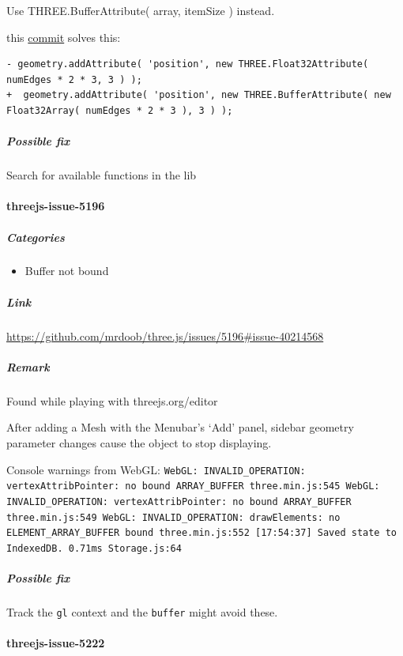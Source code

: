 \documentclass[]{article}
\begin{document}
Use THREE.BufferAttribute( array, itemSize ) instead.

this
\href{https://github.com/mrdoob/three.js/commit/e5b1d38e1e90bc9f7b16da7c1e53e66c5e8c2178}{commit}
solves this:

\begin{verbatim}
- geometry.addAttribute( 'position', new THREE.Float32Attribute( numEdges * 2 * 3, 3 ) );
+  geometry.addAttribute( 'position', new THREE.BufferAttribute( new Float32Array( numEdges * 2 * 3 ), 3 ) );
\end{verbatim}

\subparagraph{Possible fix}\label{possible-fix-2}

Search for available functions in the lib

\paragraph{threejs-issue-5196}\label{threejs-issue-5196}

\subparagraph{Categories}\label{categories-4}

\begin{itemize}
\itemsep1pt\parskip0pt
\item
  Buffer not bound
\end{itemize}

\subparagraph{Link}\label{link-4}

\url{https://github.com/mrdoob/three.js/issues/5196\#issue-40214568}

\subparagraph{Remark}\label{remark-4}

Found while playing with threejs.org/editor

After adding a Mesh with the Menubar's `Add' panel, sidebar geometry
parameter changes cause the object to stop displaying.

Console warnings from WebGL:
\texttt{WebGL: INVALID\_OPERATION: vertexAttribPointer: no bound ARRAY\_BUFFER three.min.js:545 WebGL: INVALID\_OPERATION: vertexAttribPointer: no bound ARRAY\_BUFFER three.min.js:549 WebGL: INVALID\_OPERATION: drawElements: no ELEMENT\_ARRAY\_BUFFER bound three.min.js:552 {[}17:54:37{]} Saved state to IndexedDB. 0.71ms Storage.js:64}

\subparagraph{Possible fix}\label{possible-fix-3}

Track the \texttt{gl} context and the \texttt{buffer} might avoid these.

\paragraph{threejs-issue-5222}\label{threejs-issue-5222}
\end{document}
